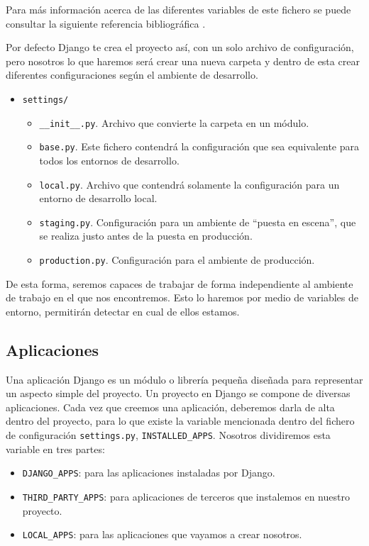 Para más información acerca de las diferentes variables de este fichero se puede consultar la siguiente referencia bibliográfica \cite{DjSett}.

Por defecto Django te crea el proyecto así, con un solo archivo de configuración, pero nosotros lo que haremos será crear una nueva carpeta y dentro de esta crear diferentes configuraciones según el ambiente de desarrollo.

\begin{itemize}
	\item \texttt{settings/}
	\begin{itemize}
		\item \texttt{\_\_init\_\_.py}. Archivo que convierte la carpeta en un módulo.
		\item \texttt{base.py}. Este fichero contendrá la configuración que sea equivalente para todos los entornos de desarrollo.
		\item \texttt{local.py}. Archivo que contendrá solamente la configuración para un entorno de desarrollo local.
		\item \texttt{staging.py}. Configuración para un ambiente de ``puesta en escena'', que se realiza justo antes de la puesta en producción.
		\item \texttt{production.py}. Configuración para el ambiente de producción.
	\end{itemize}
\end{itemize}

De esta forma, seremos capaces de trabajar de forma independiente al ambiente de trabajo en el que nos encontremos. Esto lo haremos por medio de variables de entorno, permitirán detectar en cual de ellos estamos.

\subsection{Aplicaciones}
Una aplicación Django es un módulo o librería pequeña diseñada para representar un aspecto simple del proyecto. Un proyecto en Django se compone de diversas aplicaciones. Cada vez que creemos una aplicación, deberemos darla de alta dentro del proyecto, para lo que existe la variable mencionada dentro del fichero de configuración \texttt{settings.py}, \texttt{INSTALLED\_APPS}. Nosotros dividiremos esta variable en tres partes:

\begin{itemize}
	\item \texttt{DJANGO\_APPS}: para las aplicaciones instaladas por Django.
	\item \texttt{THIRD\_PARTY\_APPS}: para aplicaciones de terceros que instalemos en nuestro proyecto.
	\item \texttt{LOCAL\_APPS}: para las aplicaciones que vayamos a crear nosotros.
\end{itemize}

